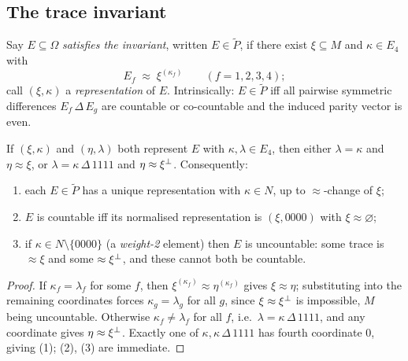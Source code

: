 \subsection{The trace invariant}

\begin{definition}\label{def:invariant}
Say $E\subseteq\Omega$ \emph{satisfies the invariant}, written
$E\in\widetilde P$, if there exist $\xi\subseteq M$ and $\kappa\in E_4$ with
\[
  E_f \;\approx\; \xi^{(\kappa_f)} \qquad (f=1,2,3,4);
\]
call $(\xi,\kappa)$ a \emph{representation} of $E$. Intrinsically:
$E\in\widetilde P$ iff all pairwise symmetric differences $E_f\,\Delta\,E_g$ are
countable or co-countable and the induced parity vector is even.
\end{definition}

\begin{lemma}\label{lem:rep-rigidity}
If $(\xi,\kappa)$ and $(\eta,\lambda)$ both represent $E$ with
$\kappa,\lambda\in E_4$, then either $\lambda=\kappa$ and $\eta\approx\xi$, or
$\lambda=\kappa\,\Delta\,1111$ and $\eta\approx\xi{}^{\perp}$. Consequently:
\begin{enumerate}[label=\textup{(\arabic*)}]
  \item each $E\in\widetilde P$ has a unique representation with $\kappa\in N$,
    up to $\approx$-change of $\xi$;
  \item $E$ is countable iff its normalised representation is $(\xi,0000)$ with
    $\xi\approx\varnothing$;
  \item if $\kappa\in N\setminus\{0000\}$ (a \emph{weight-2} element) then $E$ is
    uncountable: some trace is $\approx\xi$ and some $\approx\xi{}^{\perp}$, and these
    cannot both be countable.
\end{enumerate}
\end{lemma}

\begin{proof}
If $\kappa_f=\lambda_f$ for some $f$, then $\xi^{(\kappa_f)}\approx\eta^{(\kappa_f)}$
gives $\xi\approx\eta$; substituting into the remaining coordinates forces
$\kappa_g=\lambda_g$ for all $g$, since $\xi\approx\xi{}^{\perp}$ is impossible, $M$
being uncountable. Otherwise $\kappa_f\neq\lambda_f$ for all $f$, i.e.\
$\lambda=\kappa\,\Delta\,1111$, and any coordinate gives $\eta\approx\xi{}^{\perp}$.
Exactly one of $\kappa,\kappa\,\Delta\,1111$ has fourth coordinate $0$, giving
(1); (2), (3) are immediate.
\end{proof}

